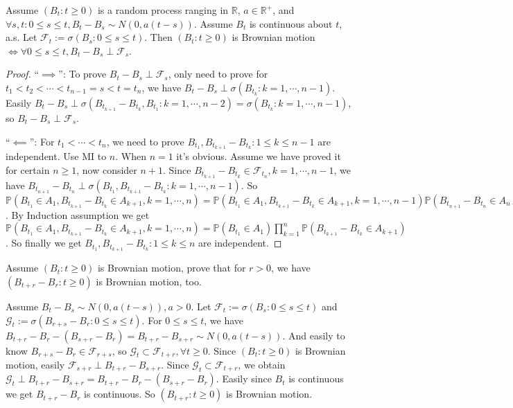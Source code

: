 \documentclass[../main]{subfiles}
\begin{document}
\begin{lemma}\label{lem:1}
  Assume \((B_t:t \geq 0)\) is a random process ranging in \(\mathbb{R}\), \(a \in \mathbb{R}^+\), and \(\forall s,t:0 \leq s \leq t,B_t-B_s \sim N(0,a(t-s))\).
  Assume \(B_t\) is continuous about \(t\), a.s.
  Let \(\mathcal{F}_t:=\sigma(B_s:0 \leq s \leq t)\).
  Then \((B_t:t \geq 0)\) is Brownian motion \(\iff \forall 0 \leq s \leq t,B_t - B_s \perp \mathcal{F}_s\).
\end{lemma}
\begin{proof}
  ``\(\implies\)'': To prove \(B_t-B_s \perp \mathcal{F}_s\), only need to prove for \(t_1 < t_2 < \cdots <t_{n-1}=s<t=t_n\), we have
  \(B_t-B_s \perp \sigma(B_{t_k}:k=1,\cdots,n-1)\).
  Easily \(B_t-B_s \perp \sigma(B_{t_{k+1}}-B_{t_k},B_{t_1}:k=1,\cdots,n-2)=\sigma(B_{t_k}:k=1,\cdots,n-1)\), so \(B_t-B_s \perp \mathcal{F}_s\).

  ``\(\impliedby\)'': For \(t_1 < \cdots < t_n\), we need to prove \(B_{t_1},B_{t_{k+1}}-B_{t_k}:1 \leq k \leq n-1\) are independent.
  Use MI to \(n\). When \(n=1\) it's obvious.
  Assume we have proved it for certain \(n \geq 1\), now consider \(n+1\).
  Since \(B_{t_{k+1}}-B_{t_k} \in \mathcal{F}_{t_n},k=1,\cdots,n-1\), we have \(B_{t_{n+1}}-B_{t_n} \perp \sigma(B_{t_1},B_{t_{k+1}}-B_{t_k}:k=1,\cdots,n-1)\).
  So \(\mathbb{P}(B_{t_1} \in A_1,B_{t_{k+1}}-B_{t_k} \in A_{k+1},k=1,\cdots,n)=\mathbb{P}(B_{t_1} \in A_1,B_{t_{k+1}}-B_{t_k} \in A_{k+1},k=1,\cdots,n-1)\mathbb{P}(B_{t_{n+1}}-B_{t_n} \in A_{n+1})\).
  By Induction assumption we get \(\mathbb{P}(B_{t_1} \in A_1,B_{t_{k+1}}-B_{t_k} \in A_{k+1},k=1,\cdots,n)=\mathbb{P}(B_{t_1}\in A_1) \prod_{k=1}^{n}\mathbb{P}(B_{t_{k+1}}-B_{t_k} \in A_{k+1})\).
  So finally we get \(B_{t_1},B_{t_{k+1}}-B_{t_k}:1 \leq k \leq n\) are independent.
\end{proof}

\begin{problem}\label{pro:1}
  Assume \((B_t:t \geq 0)\) is Brownian motion, prove that for \(r>0\), we have \((B_{t + r}-B_r:t \geq 0)\) is Brownian motion, too.
\end{problem}
\begin{solution}
  Assume \(B_t-B_s \sim N(0,a(t-s)),a >0\).
  Let \(\mathcal{F}_t:=\sigma(B_s:0 \leq s \leq t)\) and \(\mathcal{G}_t:=\sigma(B_{r+s}-B_r:0 \leq s \leq t)\).
  For \(0 \leq s \leq t\), we have \(B_{t+r}-B_r -(B_{s+r}-B_r)=B_{t+r}-B_{s+r} \sim N(0,a(t-s))\).
  And easily to know \(B_{r + s}-B_r \in \mathcal{F}_{r+s}\), so \(\mathcal{G}_t \subset \mathcal{F}_{t+r},\forall t \geq 0\).
  Since \((B_t:t \geq 0)\) is Brownian motion, easily \(\mathcal{F}_{s+r} \perp B_{t+r}-B_{s+r}\).
  Since \(\mathcal{G}_{t}\subset \mathcal{F}_{t +r}\), we obtain \(\mathcal{G}_t \perp B_{t + r}-B_{s + r}=B_{t+r}-B_r -(B_{s+r}-B_r)\).
  Easily since \(B_t\) is continuous we get \(B_{t + r}-B_r\) is continuous.
  So \((B_{t+r}:t \geq 0)\) is Brownian motion.
\end{solution}
\end{document}
